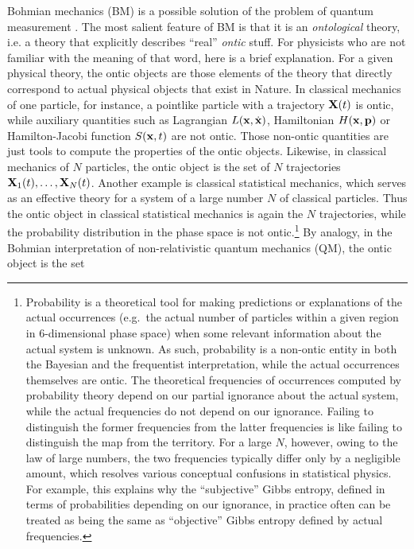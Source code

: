 \documentclass[12pt]{article}
\begin{document}
Bohmian mechanics (BM) is a possible solution of the problem of quantum measurement 
\cite{bohm,book-bohm,book-hol,book-durr,oriols,nikIBM}.
The most salient feature of BM  is that it is an {\em ontological} theory, i.e. a theory 
that explicitly describes ``real'' {\em ontic} stuff. For physicists who are not familiar with the meaning 
of that word, here is a brief explanation. For a given physical theory,
the ontic objects are those elements of the theory that directly correspond to actual physical objects 
that exist in Nature. In classical mechanics of one particle, for instance, a pointlike particle with a trajectory
${\bf X}(t)$ is ontic, while auxiliary quantities such as Lagrangian $L({\bf x},\dot{\bf x})$, Hamiltonian
$H({\bf x},{\bf p})$ or Hamilton-Jacobi function $S({\bf x},t)$ are not ontic. Those non-ontic 
quantities are just tools to compute the properties of the ontic objects. 
Likewise, in classical mechanics of $N$ particles, the ontic object is the set of $N$ trajectories
${\bf X}_1(t), \ldots, {\bf X}_N(t)$.
Another example is classical statistical
mechanics, which serves as an effective theory for a system of a large number $N$ of classical particles.
Thus the ontic object in classical statistical mechanics is again the $N$ trajectories,
while the probability distribution in the phase space 
is not ontic.\footnote{Probability is a theoretical tool for making predictions or explanations of the actual occurrences
(e.g.~the actual number of particles within a given region in 6-dimensional phase space)
when some relevant information about the actual system is unknown.
As such, probability is a non-ontic entity in both the Bayesian and the frequentist interpretation,
while the actual occurrences themselves are ontic.
The theoretical frequencies of occurrences computed by probability theory depend on our partial ignorance
about the actual system, while the actual frequencies do not depend on our ignorance. 
Failing to distinguish the former frequencies from the latter frequencies
is like failing to distinguish the map from the territory.
For a large $N$, however, owing to the law of large numbers, the two frequencies typically differ only by a negligible amount,
which resolves various conceptual confusions in statistical physics. For example,
this explains why the ``subjective'' Gibbs entropy, defined in terms of probabilities depending on our ignorance, in practice often can be treated as being the same as
``objective'' Gibbs entropy defined by actual frequencies.}
By analogy, in the Bohmian interpretation of non-relativistic 
quantum mechanics (QM), the ontic object is the set 
\end{document}
